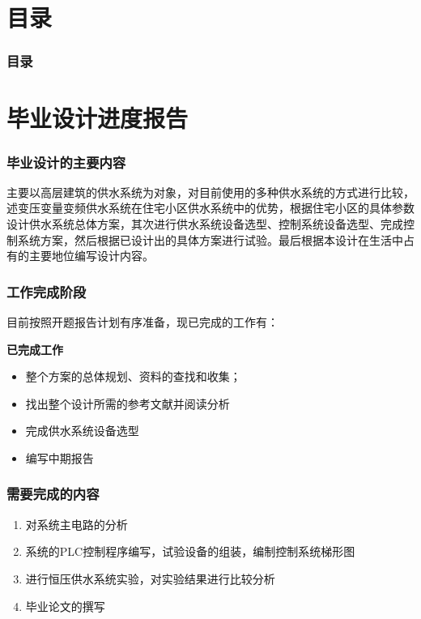 \documentclass{CUCBeamer}
\title[报告演示文稿模板]{\fontsize{13pt}{18pt}\selectfont {中国传媒大学非官方演示文稿模板}}
\subtitle{\fontsize{9pt}{14pt}\selectfont \textbf{Communication University Of China Unofficial beamer theme}}
\author[讲演者]{
  讲演者姓名 \\
  {\small {1234567890}}
}
\institute[FICS]{
  信息与通信工程学院 \\
  中国传媒大学}
\date[\today]{
 \today}
\begin{document}
\begin{frame}
\titlepage
\end{frame}				%

\section*{目录}

		\begin{frame}
		\frametitle{\textbf{目录}}
		\textbf{\tableofcontents}
		\end{frame}				%

\section[进度]{毕业设计进度报告}
    \begin{frame}
        \frametitle{毕业设计的主要内容}
        主要以高层建筑的供水系统为对象，对目前使用的多种供水系统的方式进行比较，述变压变量变频供水系统在住宅小区供水系统中的优势，根据住宅小区的具体参数设计供水系统总体方案，其次进行供水系统设备选型、控制系统设备选型、完成控制系统方案，然后根据已设计出的具体方案进行试验。最后根据本设计在生活中占有的主要地位编写设计内容。    
    \end{frame}

    \begin{frame}
        \frametitle{工作完成阶段}
            目前按照开题报告计划有序准备，现已完成的工作有：
            \begin{block}{\textbf{已完成工作}}
                \begin{itemize}
                    \item 整个方案的总体规划、资料的查找和收集；
                    \item 找出整个设计所需的参考文献并阅读分析
                    \item 完成供水系统设备选型
                    \item 编写中期报告
                \end{itemize}
            \end{block}
    \end{frame}

    \begin{frame}
        \frametitle{需要完成的内容}
            \begin{enumerate}
                \item 对系统主电路的分析
                \item 系统的PLC控制程序编写，试验设备的组装，编制控制系统梯形图
                \item 进行恒压供水系统实验，对实验结果进行比较分析
                \item 毕业论文的撰写
            \end{enumerate}
    \end{frame}
\end{document}

